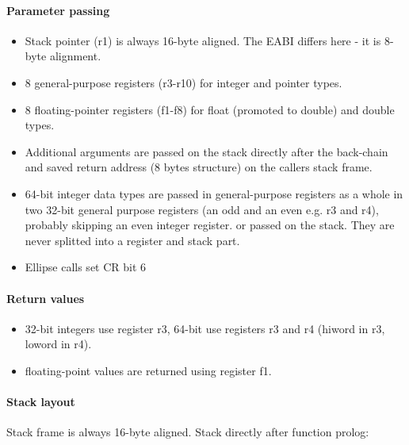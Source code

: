 \paragraph{Parameter passing}

\begin{itemize}
\item Stack pointer (r1) is always 16-byte aligned. The EABI differs here - it is 8-byte alignment.
\item 8 general-purpose registers (r3-r10) for integer and pointer types.
\item 8 floating-pointer registers (f1-f8) for float (promoted to double) and double types.
\item Additional arguments are passed on the stack directly after the back-chain and saved return address (8 bytes structure) on the callers stack frame.
\item 64-bit integer data types are passed in general-purpose registers as a whole in two
 32-bit general purpose registers (an odd and an even e.g. r3 and r4), probably skipping an even integer register.
 or passed on the stack. They are never splitted into a register and stack part.
\item Ellipse calls set CR bit 6 

\end{itemize}

\paragraph{Return values}

\begin{itemize}
\item 32-bit integers use register r3, 64-bit use registers r3 and r4 (hiword in r3, loword in r4).
\item floating-point values are returned using register f1.
\end{itemize}

\pagebreak

\paragraph{Stack layout}

Stack frame is always 16-byte aligned. Stack directly after function prolog:\\

